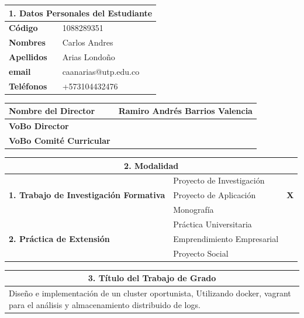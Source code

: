 \documentclass[letter,12pt]{article}
\begin{document}
\begin{center}
\begin{tabular}{|p{5.5cm}|p{9.5cm}|}
\hline
\multicolumn{2}{|c|}{\textbf{1. Datos Personales del Estudiante}}\\
\hline
\textbf{Código} & 1088289351 \\
\hline
\textbf{Nombres} & Carlos Andres\\
\hline
\textbf{Apellidos} & Arias Londoño\\
\hline
\textbf{email} & caanarias@utp.edu.co \\
\hline
\textbf{Teléfonos} & +573104432476 \\
\hline
\end{tabular}
\end{center}
\begin{center}
\begin{tabular}{|p{5.5cm}|p{9.5cm}|}
\hline
\textbf{Nombre del Director} & Ramiro Andrés Barrios Valencia \\
\hline
\textbf{VoBo Director} &  \\
\hline
\textbf{VoBo Comité Curricular} &  \\
\hline
\end{tabular}
\end{center}
\begin{center}
\begin{tabular}{|p{5.5cm}|p{8.5cm}|p{0.5cm}|}
\hline
\multicolumn{3}{|c|}{\textbf{2. Modalidad}}\\
\hline
\multirow{3}{5cm}{\textbf{1. Trabajo de Investigación Formativa}} & Proyecto de Investigación &  \\ \cline{2-3}
& Proyecto de Aplicación &  \textbf{X}\\ \cline{2-3}
& Monografía &  \\ 
\hline
\multirow{3}{5cm}{\textbf{2. Práctica de Extensión}} & Práctica Universitaria &  \\ \cline{2-3}
& Emprendimiento Empresarial &  \\ \cline{2-3}
& Proyecto Social &  \\
\hline
\end{tabular}
\end{center}
\newpage
\begin{center}
\begin{tabular}{|p{15.5cm}|}
\hline
\multicolumn{1}{|c|}{ \textbf{3. Título del Trabajo de Grado}}\\
\hline
Diseño e implementación de un cluster oportunista, Utilizando docker, vagrant para el análisis y almacenamiento distribuido de logs.\\
\hline
\end{tabular}
\end{center}
    
\end{document}
